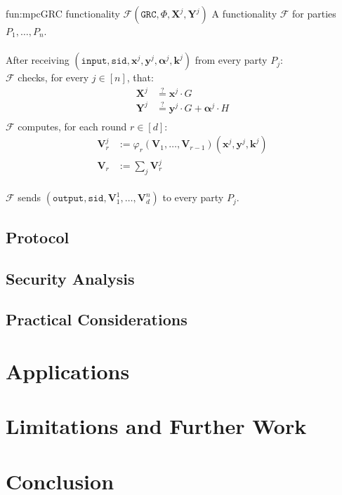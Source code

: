 \begin{afunctionality}{fun:mpc}{GRC functionality $\mathcal{F}(\texttt{GRC}, \Phi, \textbf{X}^j, \textbf{Y}^j)$}
A functionality $\mathcal{F}$ for parties $P_1, \ldots, P_n$.\\
\\
After receiving
$(\texttt{input}, \texttt{sid}, \textbf{x}^j, \textbf{y}^j, \boldsymbol{\alpha}^j, \textbf{k}^j)$ from every party $P_j$:\\
$\mathcal{F}$ checks, for every $j \in [n]$, that:
$$
\begin{aligned}
    \textbf{X}^j &\stackrel{?}{=} \textbf{x}^j \cdot G\\
    \textbf{Y}^j &\stackrel{?}{=} \textbf{y}^j \cdot G + \boldsymbol{\alpha}^j \cdot H\\
\end{aligned}
$$
$\mathcal{F}$ computes, for each round $r \in [d]$:
$$
\begin{aligned}
    \textbf{V}^j_{r} &:= \varphi_{r}(\textbf{V}_{1}, \ldots, \textbf{V}_{r - 1})(
        \textbf{x}^j, \textbf{y}^j, \textbf{k}^j
    )\\
    \textbf{V}_r &:= \sum_j \textbf{V}^j_r
\end{aligned}
$$\\
$\mathcal{F}$ sends $(\texttt{output}, \texttt{sid}, \textbf{V}^1_1, \ldots, \textbf{V}^n_d)$ to every party $P_j$.
\end{afunctionality}

\subsection{Protocol}

\subsection{Security Analysis}

\subsection{Practical Considerations}

\section{Applications}

\section{Limitations and Further Work}

\section{Conclusion}


\small 

